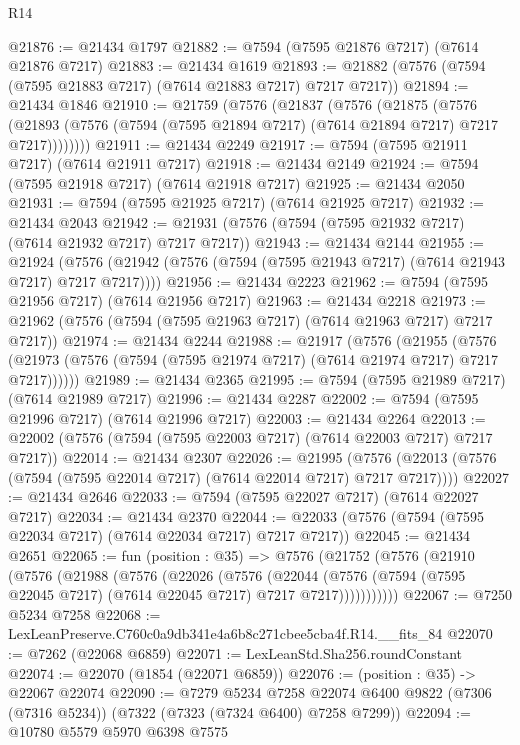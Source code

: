 \begin{lexlean}{R14}
\begin{coremodule}
@21876 := @21434 @1797
@21882 := @7594 (@7595 @21876 @7217) (@7614 @21876 @7217)
@21883 := @21434 @1619
@21893 := @21882 (@7576 (@7594 (@7595 @21883 @7217) (@7614 @21883 @7217) @7217 @7217))
@21894 := @21434 @1846
@21910 := @21759
    (@7576
      (@21837
        (@7576
          (@21875
            (@7576
              (@21893 (@7576 (@7594 (@7595 @21894 @7217) (@7614 @21894 @7217) @7217 @7217))))))))
@21911 := @21434 @2249
@21917 := @7594 (@7595 @21911 @7217) (@7614 @21911 @7217)
@21918 := @21434 @2149
@21924 := @7594 (@7595 @21918 @7217) (@7614 @21918 @7217)
@21925 := @21434 @2050
@21931 := @7594 (@7595 @21925 @7217) (@7614 @21925 @7217)
@21932 := @21434 @2043
@21942 := @21931 (@7576 (@7594 (@7595 @21932 @7217) (@7614 @21932 @7217) @7217 @7217))
@21943 := @21434 @2144
@21955 := @21924
    (@7576 (@21942 (@7576 (@7594 (@7595 @21943 @7217) (@7614 @21943 @7217) @7217 @7217))))
@21956 := @21434 @2223
@21962 := @7594 (@7595 @21956 @7217) (@7614 @21956 @7217)
@21963 := @21434 @2218
@21973 := @21962 (@7576 (@7594 (@7595 @21963 @7217) (@7614 @21963 @7217) @7217 @7217))
@21974 := @21434 @2244
@21988 := @21917
    (@7576
      (@21955
        (@7576 (@21973 (@7576 (@7594 (@7595 @21974 @7217) (@7614 @21974 @7217) @7217 @7217))))))
@21989 := @21434 @2365
@21995 := @7594 (@7595 @21989 @7217) (@7614 @21989 @7217)
@21996 := @21434 @2287
@22002 := @7594 (@7595 @21996 @7217) (@7614 @21996 @7217)
@22003 := @21434 @2264
@22013 := @22002 (@7576 (@7594 (@7595 @22003 @7217) (@7614 @22003 @7217) @7217 @7217))
@22014 := @21434 @2307
@22026 := @21995
    (@7576 (@22013 (@7576 (@7594 (@7595 @22014 @7217) (@7614 @22014 @7217) @7217 @7217))))
@22027 := @21434 @2646
@22033 := @7594 (@7595 @22027 @7217) (@7614 @22027 @7217)
@22034 := @21434 @2370
@22044 := @22033 (@7576 (@7594 (@7595 @22034 @7217) (@7614 @22034 @7217) @7217 @7217))
@22045 := @21434 @2651
@22065 := fun (position : @35) =>
  @7576
    (@21752
      (@7576
        (@21910
          (@7576
            (@21988
              (@7576
                (@22026
                  (@7576
                    (@22044
                      (@7576 (@7594 (@7595 @22045 @7217) (@7614 @22045 @7217) @7217 @7217)))))))))))
@22067 := @7250 @5234 @7258
@22068 := LexLeanPreserve.C760c0a9db341e4a6b8c271cbee5cba4f.R14.__fits_84
@22070 := @7262 (@22068 @6859)
@22071 := LexLeanStd.Sha256.roundConstant
@22074 := @22070 (@1854 (@22071 @6859))
@22076 := (position : @35) -> @22067 @22074
@22090 := @7279
    @5234
    @7258
    @22074
    @6400
    @9822
    (@7306 (@7316 @5234))
    (@7322 (@7323 (@7324 @6400) @7258 @7299))
@22094 := @10780 @5579 @5970 @6398 @7575

\end{coremodule}
\end{lexlean}

